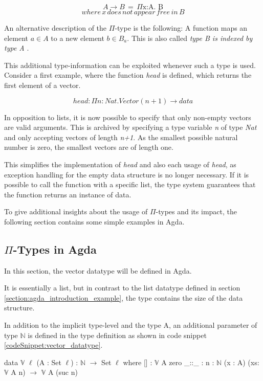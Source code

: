 $$A \rightarrow B \, = \, \Pi \text{x:A. B}$$
$$where \, x \, does \, not \, appear \, free \, in \, B$$

An alternative description of the $\Pi$-type is the following: A function maps an element $a \in A$ to a new element $b \in B_a$. 
This is also called \emph{type B is indexed by type A} \cite{10.1145/2841316}.

This additional type-information can be exploited whenever such a type is used. 
Consider a first example, where the function \emph{head} is defined, which returns the first element of a vector.

$$head : \Pi n : Nat.Vector(n+1) \rightarrow data$$

In opposition to lists, it is now possible to specify that only non-empty vectors are valid arguments. 
This is archived by specifying a type variable \emph{n} of type \emph{Nat} and only accepting vectors of length \emph{n+1}.
As the smallest possible natural number is zero, the smallest vectors are of length one.

This simplifies the implementation of \emph{head} and also each usage of \emph{head}, as exception handling for the empty data structure is no longer necessary. 
If it is possible to call the function with a specific list, the type system guarantees that the function returns an instance of data.

To give additional insights about the usage of $\Pi$-types and its impact, the following section contains some simple examples in Agda.

\subsection{$\Pi$-Types in Agda}\label{section_dependent_types_example}
In this section, the vector datatype will be defined in Agda.

It is essentially a list, but in contrast to the list datatype defined in section \ref{section:agda_introduction_example}, the type contains the size of the data structure.

In addition to the implicit type-level and the type A, an additional parameter of type $\mathbb{N}$ is defined in the type definition as shown in code snippet \ref{codeSnippet:vector_datatype}.

\begin{codesnippet}[mathescape=true, caption={Definition of the vector datatype in Agda}, label={codeSnippet:vector_datatype}]
data $\mathbb{V}$ {$\ell$} (A : Set $\ell$) : $\mathbb{N}$ $\rightarrow$ Set $\ell$ where
  [] : $\mathbb{V}$ A zero
  _::_ : {n : $\mathbb{N}$} (x : A) (xs: $\mathbb{V}$ A n) $\rightarrow$
         $\mathbb{V}$ A (suc n)
\end{codesnippet}

